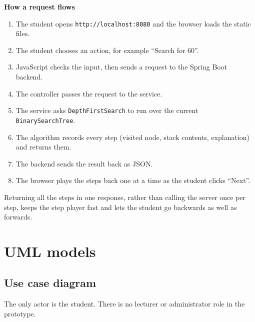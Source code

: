 \documentclass[11pt,a4paper]{article}
\newcommand{\code}[1]{\texttt{#1}}
\begin{document}
\textbf{How a request flows}
\begin{enumerate}
  \item The student opens \code{http://localhost:8080} and the browser loads the static files.
  \item The student chooses an action, for example ``Search for 60''.
  \item JavaScript checks the input, then sends a request to the Spring Boot backend.
  \item The controller passes the request to the service.
  \item The service asks \code{DepthFirstSearch} to run over the current \code{BinarySearchTree}.
  \item The algorithm records every step (visited node, stack contents, explanation) and returns them.
  \item The backend sends the result back as JSON.
  \item The browser plays the steps back one at a time as the student clicks ``Next''.
\end{enumerate}

Returning all the steps in one response, rather than calling the server once per step, keeps the
step player fast and lets the student go backwards as well as forwards.

\section{UML models}

\subsection{Use case diagram}

The only actor is the student. There is no lecturer or administrator role in the prototype.
\end{document}
